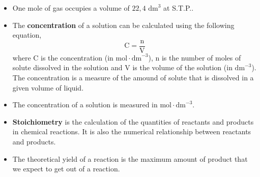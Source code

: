 \begin{itemize}[noitemsep]
\item One mole of gas occupies a volume of $22,4 {\text{ dm}}^{3}$ at S.T.P..
\item The \textbf{concentration} of a solution can be calculated using the following equation,
\label{m38712*id286019}\nopagebreak\noindent{}
    \begin{equation*}
    \text{C}=\frac{\text{n}}{\text{V}}
      \end{equation*}
where C is the concentration (in $\text{mol} \cdot {\text{dm}}^{-3}$), n is the number of moles of solute dissolved in the solution and V is the volume of the solution (in ${\text{dm}}^{-3}$). The concentration is a measure of the amound of solute that is dissolved in a given volume of liquid.
\item The concentration of a solution is measured in $\text{mol} \cdot {\text{dm}}^{-3}$.
\item \textbf{Stoichiometry} is the calculation of the quantities of reactants and products in chemical reactions. It is also the numerical relationship between reactants and products.
\item The theoretical yield of a reaction is the maximum amount of product that we expect to get out of a reaction.\end{itemize}
\label{m38712*secfhsst!!!underscore!!!id2334}
